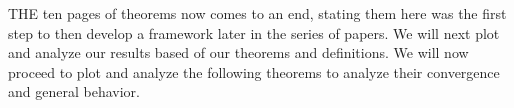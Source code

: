 \documentclass[10pt]{article}
\theoremstyle{plain}
\theoremstyle{definition}
\theoremstyle{remark}
\begin{document}
\lettrine[lines=2, lhang=0.1, loversize=0.2]{T}HE ten pages of theorems now comes to an end, stating them here was the first step to then develop a framework later in the series of papers. We will next plot and analyze our results based of our theorems and definitions. We will now proceed to plot and analyze the following theorems to analyze their convergence and general behavior.

\nocite{*}




\end{document}
